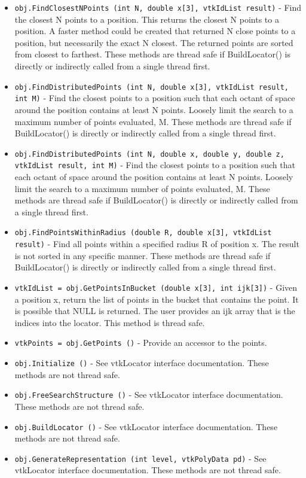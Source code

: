 \begin{itemize}
\item  \verb|obj.FindClosestNPoints (int N, double x[3], vtkIdList result)| -  Find the closest N points to a position. This returns the closest
 N points to a position. A faster method could be created that returned
 N close points to a position, but necessarily the exact N closest.
 The returned points are sorted from closest to farthest.
 These methods are thread safe if BuildLocator() is directly or
 indirectly called from a single thread first.

\item  \verb|obj.FindDistributedPoints (int N, double x[3], vtkIdList result, int M)| -  Find the closest points to a position such that each octant of
 space around the position contains at least N points. Loosely 
 limit the search to a maximum number of points evaluated, M. 
 These methods are thread safe if BuildLocator() is directly or
 indirectly called from a single thread first.

\item  \verb|obj.FindDistributedPoints (int N, double x, double y, double z, vtkIdList result, int M)| -  Find the closest points to a position such that each octant of
 space around the position contains at least N points. Loosely 
 limit the search to a maximum number of points evaluated, M. 
 These methods are thread safe if BuildLocator() is directly or
 indirectly called from a single thread first.

\item  \verb|obj.FindPointsWithinRadius (double R, double x[3], vtkIdList result)| -  Find all points within a specified radius R of position x.
 The result is not sorted in any specific manner.
 These methods are thread safe if BuildLocator() is directly or
 indirectly called from a single thread first.

\item  \verb|vtkIdList = obj.GetPointsInBucket (double x[3], int ijk[3])| -  Given a position x, return the list of points in the bucket that
 contains the point. It is possible that NULL is returned. The user
 provides an ijk array that is the indices into the locator.
 This method is thread safe.

\item  \verb|vtkPoints = obj.GetPoints ()| -  Provide an accessor to the points.

\item  \verb|obj.Initialize ()| -  See vtkLocator interface documentation.
 These methods are not thread safe.

\item  \verb|obj.FreeSearchStructure ()| -  See vtkLocator interface documentation.
 These methods are not thread safe.

\item  \verb|obj.BuildLocator ()| -  See vtkLocator interface documentation.
 These methods are not thread safe.

\item  \verb|obj.GenerateRepresentation (int level, vtkPolyData pd)| -  See vtkLocator interface documentation.
 These methods are not thread safe.

\end{itemize}
